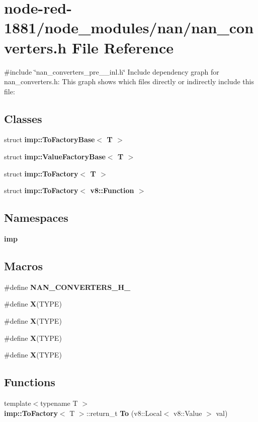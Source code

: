 \section{node-\/red-\/1881/node\+\_\+modules/nan/nan\+\_\+converters.h File Reference}
\label{nan__converters_8h}
{\ttfamily \#include \char`\"{}nan\+\_\+converters\+\_\+pre\+\_\+\_\+inl.\+h\char`\"{}}\newline
Include dependency graph for nan\+\_\+converters.\+h\+:
This graph shows which files directly or indirectly include this file\+:
\subsection*{Classes}
\begin{DoxyCompactItemize}
\item 
struct \textbf{ imp\+::\+To\+Factory\+Base$<$ T $>$}
\item 
struct \textbf{ imp\+::\+Value\+Factory\+Base$<$ T $>$}
\item 
struct \textbf{ imp\+::\+To\+Factory$<$ T $>$}
\item 
struct \textbf{ imp\+::\+To\+Factory$<$ v8\+::\+Function $>$}
\end{DoxyCompactItemize}
\subsection*{Namespaces}
\begin{DoxyCompactItemize}
\item 
 \textbf{ imp}
\end{DoxyCompactItemize}
\subsection*{Macros}
\begin{DoxyCompactItemize}
\item 
\#define \textbf{ N\+A\+N\+\_\+\+C\+O\+N\+V\+E\+R\+T\+E\+R\+S\+\_\+\+H\+\_\+}
\item 
\#define \textbf{ X}(T\+Y\+PE)
\item 
\#define \textbf{ X}(T\+Y\+PE)
\item 
\#define \textbf{ X}(T\+Y\+PE)
\item 
\#define \textbf{ X}(T\+Y\+PE)
\end{DoxyCompactItemize}
\subsection*{Functions}
\begin{DoxyCompactItemize}
\item 
{\footnotesize template$<$typename T $>$ }\\\textbf{ imp\+::\+To\+Factory}$<$ T $>$\+::return\+\_\+t \textbf{ To} (v8\+::\+Local$<$ v8\+::\+Value $>$ val)
\end{DoxyCompactItemize}


